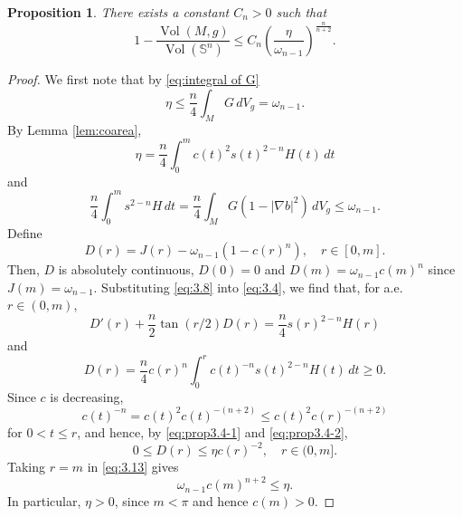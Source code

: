 \documentclass[11pt]{amsart}
\theoremstyle{plain}
\newtheorem{proposition}[theorem]{Proposition}
\numberwithin{equation}{section}
\renewcommand{\S}{\mathbb{S}}
\DeclareMathOperator{\vol}{Vol}
\newcommand{\dvol}{\,dV_g}
\begin{document}
\begin{proposition}\label{prop3.4}
There exists a constant $C_n>0$ such that
\begin{equation}\label{eq:prop3.4}
1-\frac{\vol(M,g)}{\vol(\S^n)}\le C_n\left(\frac{\eta}{\omega_{n-1}}\right)^{\frac{n}{n+2}}.
\end{equation}
\end{proposition}
\begin{proof}
We first note that by \eqref{eq:integral of G}
\begin{equation*}
\eta \le \frac{n}{4}\int_M G\dvol=\omega_{n-1}.
\end{equation*}
By Lemma \ref{lem:coarea}, 
\begin{equation}\label{eq:prop3.4-1}
\eta=\frac{n}{4}\int_0^mc(t)^2s(t)^{2-n}H(t)\,dt
\end{equation}
and
\begin{equation}\label{eq:prop3.4-2}
\frac{n}{4}\int_0^ms^{2-n}H\,dt=\frac{n}{4}\int_M G(1-|\nabla b|^2)\dvol\le\omega_{n-1}.
\end{equation}
Define 
\begin{equation*}
D(r)=J(r)-\omega_{n-1}(1-c(r)^n),\quad r\in[0,m].
\end{equation*}
Then, $D$ is absolutely continuous, $D(0)=0$ and $D(m)=\omega_{n-1}c(m)^n$ since $J(m)=\omega_{n-1}$. Substituting \eqref{eq:3.8} into \eqref{eq:3.4}, we find that, for a.e. $r\in(0,m)$,
\begin{equation*}
D'(r)+\frac{n}{2}\tan(r/2)D(r)=\frac{n}{4}s(r)^{2-n}H(r)
\end{equation*}
and
\begin{equation*}
D(r)=\frac{n}{4}c(r)^n\int_0^rc(t)^{-n}s(t)^{2-n}H(t)\,dt\ge0.
\end{equation*}
Since $c$ is decreasing,
\begin{equation*}
c(t)^{-n}=c(t)^2c(t)^{-(n+2)}\le c(t)^2c(r)^{-(n+2)}
\end{equation*}
for $0<t\le r$, and hence, by \eqref{eq:prop3.4-1} and \eqref{eq:prop3.4-2}, 
\begin{equation}\label{eq:3.13}
0\le D(r)\le \eta c(r)^{-2},\quad r\in(0,m].
\end{equation}
Taking $r=m$ in \eqref{eq:3.13} gives
\begin{equation}\label{eq:3.14}
\omega_{n-1}c(m)^{n+2}\le \eta.
\end{equation}
In particular, $\eta>0$, since $m<\pi$ and hence $c(m)>0$.


\end{proof}
\end{document}
